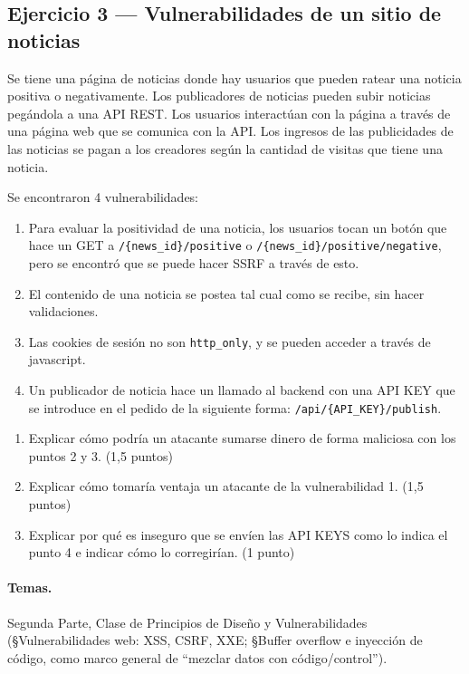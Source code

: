 \subsection{Ejercicio 3 --- Vulnerabilidades de un sitio de noticias}

\begin{consigna}
Se tiene una página de noticias donde hay usuarios que pueden ratear una noticia
positiva o negativamente. Los publicadores de noticias pueden subir noticias
pegándola a una API REST. Los usuarios interactúan con la página a través de una
página web que se comunica con la API. Los ingresos de las publicidades de las
noticias se pagan a los creadores según la cantidad de visitas que tiene una noticia.

Se encontraron 4 vulnerabilidades:
\begin{enumerate}
  \item Para evaluar la positividad de una noticia, los usuarios tocan un botón que
  hace un GET a \texttt{/\{news\_id\}/positive} o \texttt{/\{news\_id\}/positive/negative},
  pero se encontró que se puede hacer SSRF a través de esto.
  \item El contenido de una noticia se postea tal cual como se recibe, sin hacer
  validaciones.
  \item Las cookies de sesión no son \texttt{http\_only}, y se pueden acceder a través
  de javascript.
  \item Un publicador de noticia hace un llamado al backend con una API KEY que se
  introduce en el pedido de la siguiente forma: \texttt{/api/\{API\_KEY\}/publish}.
\end{enumerate}
\begin{enumerate}
  \item[a)] Explicar cómo podría un atacante sumarse dinero de forma maliciosa con los
  puntos 2 y 3. (1,5 puntos)
  \item[b)] Explicar cómo tomaría ventaja un atacante de la vulnerabilidad 1. (1,5 puntos)
  \item[c)] Explicar por qué es inseguro que se envíen las API KEYS como lo indica el
  punto 4 e indicar cómo lo corregirían. (1 punto)
\end{enumerate}
\end{consigna}

\paragraph{Temas.}
Segunda Parte, Clase de Principios de Diseño y Vulnerabilidades (\S Vulnerabilidades
web: XSS, CSRF, XXE; \S Buffer overflow e inyección de código, como marco general de
``mezclar datos con código/control'').

